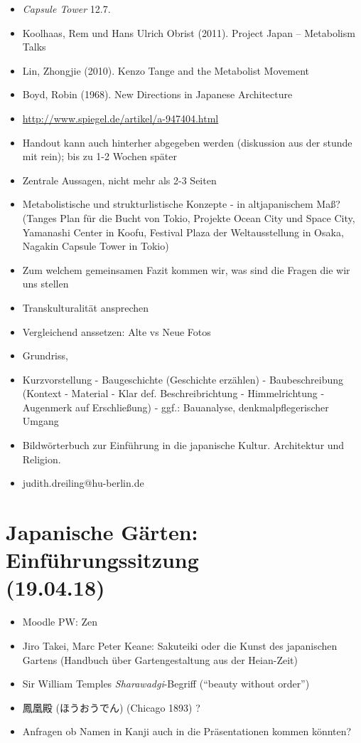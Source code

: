 \documentclass[emulatestandardclasses]{scrartcl}
\begin{document}
\begin{itemize}
  \item \emph{Capsule Tower} 12.7.
  \item Koolhaas, Rem und Hans Ulrich Obrist (2011). Project Japan – Metabolism Talks
  \item Lin, Zhongjie (2010). Kenzo Tange and the Metabolist Movement
  \item Boyd, Robin (1968). New Directions in Japanese Architecture
  \item \url{http://www.spiegel.de/artikel/a-947404.html}
  \item Handout kann auch hinterher abgegeben werden (diskussion aus der stunde mit rein); bis zu 1-2 Wochen später
  \item Zentrale Aussagen, nicht mehr als 2-3 Seiten
  \item Metabolistische und strukturlistische Konzepte - in altjapanischem Maß? (Tanges Plan für die Bucht von Tokio, Projekte Ocean City und Space City, Yamanashi Center in Koofu, Festival Plaza der Weltausstellung in Osaka, Nagakin Capsule Tower in Tokio)
  \item Zum welchem gemeinsamen Fazit kommen wir, was sind die Fragen die wir uns stellen
  \item Transkulturalität ansprechen
  \item Vergleichend anssetzen: Alte vs Neue Fotos
  \item Grundriss,
  \item Kurzvorstellung - Baugeschichte (Geschichte erzählen) - Baubeschreibung (Kontext - Material - Klar def. Beschreibrichtung - Himmelrichtung - Augenmerk auf Erschließung) - ggf.: Bauanalyse, denkmalpflegerischer Umgang
  \item Bildwörterbuch zur Einführung in die japanische Kultur. Architektur und Religion. 
  \item judith.dreiling@hu-berlin.de
\end{itemize}


\section{Japanische Gärten: Einführungssitzung\\(19.04.18)}

\begin{itemize}
  \item Moodle PW: Zen
  \item Jiro Takei, Marc Peter Keane: Sakuteiki oder die Kunst des japanischen Gartens (Handbuch über Gartengestaltung aus der Heian-Zeit)
  \item Sir William Temples \emph{Sharawadgi}-Begriff ("`beauty without order"')
  \item 鳳凰殿 (ほうおうでん) (Chicago 1893) ?
  \item Anfragen ob Namen in Kanji auch in die Präsentationen kommen könnten?
\end{itemize}
\end{document}
